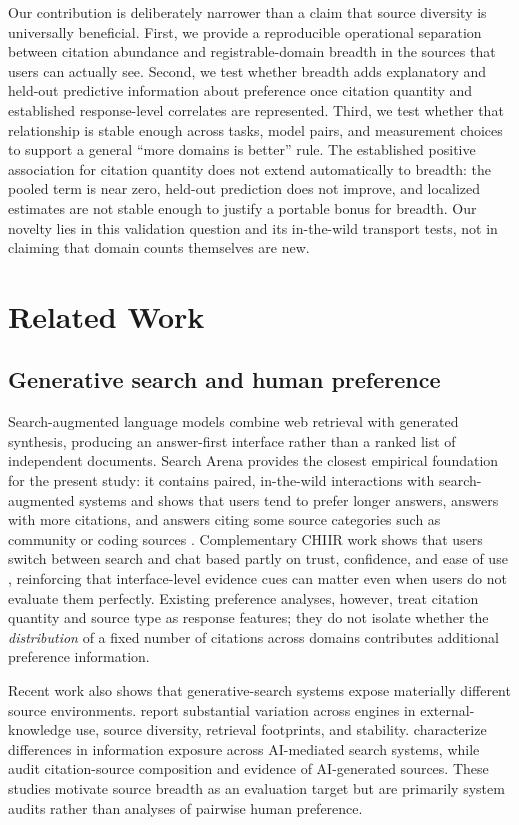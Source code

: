 \documentclass[sigconf,natbib=true,anonymous=true]{acmart}
\begin{document}
Our contribution is deliberately narrower than a claim that source diversity is universally beneficial. First, we provide a reproducible operational separation between citation abundance and registrable-domain breadth in the sources that users can actually see. Second, we test whether breadth adds explanatory and held-out predictive information about preference once citation quantity and established response-level correlates are represented. Third, we test whether that relationship is stable enough across tasks, model pairs, and measurement choices to support a general ``more domains is better'' rule. The established positive association for citation quantity does not extend automatically to breadth: the pooled term is near zero, held-out prediction does not improve, and localized estimates are not stable enough to justify a portable bonus for breadth. Our novelty lies in this validation question and its in-the-wild transport tests, not in claiming that domain counts themselves are new.

\section{Related Work}
\subsection{Generative search and human preference}
Search-augmented language models combine web retrieval with generated synthesis, producing an answer-first interface rather than a ranked list of independent documents. Search Arena provides the closest empirical foundation for the present study: it contains paired, in-the-wild interactions with search-augmented systems and shows that users tend to prefer longer answers, answers with more citations, and answers citing some source categories such as community or coding sources \citep{miroyan2026searcharena}. Complementary CHIIR work shows that users switch between search and chat based partly on trust, confidence, and ease of use \citep{mayerhofer2025blending}, reinforcing that interface-level evidence cues can matter even when users do not evaluate them perfectly. Existing preference analyses, however, treat citation quantity and source type as response features; they do not isolate whether the \emph{distribution} of a fixed number of citations across domains contributes additional preference information.

Recent work also shows that generative-search systems expose materially different source environments. \citet{kirsten2026characterizing} report substantial variation across engines in external-knowledge use, source diversity, retrieval footprints, and stability. \citet{huang2026answerbubbles} characterize differences in information exposure across AI-mediated search systems, while \citet{allaham2026syntheticsources} audit citation-source composition and evidence of AI-generated sources. These studies motivate source breadth as an evaluation target but are primarily system audits rather than analyses of pairwise human preference.
\end{document}
